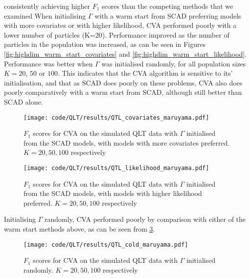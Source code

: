 \documentclass{amsart}[12pt]
\begin{document}
consistently achieving higher $F_1$ scores than the competing methods that we examined
When initialising $\Gamma$ with a warm start from SCAD preferring models with more covariates or with higher
likelihood, CVA performed poorly with a lower number of particles (K=$20$). Performance improved as the number
of particles in the population was increased, as can be seen in Figures
\ref{fig:highdim_warm_start_covariates} and \ref{fig:highdim_warm_start_likelihood}. Performance was better
when $\Gamma$ was initialised randomly, for all population sizes $K=20$, $50$ or $100$. This indicates that
the CVA algorithm is sensitive to its' initialisation, and that as SCAD does poorly on these problems, CVA
also does poorly comparatively with a warm start from SCAD, although still better than SCAD alone.

\begin{figure}\label{fig:QLT_warm_start_covariates}
\caption{$F_1$ scores for CVA on the simulated QLT data with $\Gamma$ initialised from the SCAD models, with
models with more covariates preferred. $K=20, 50, 100$ respectively}
\texttt{[image: code/QLT/results/QTL\_covariates\_maruyama.pdf]}

\end{figure}

\begin{figure}\label{fig:QLT_warm_start_covariates}
\caption{$F_1$ scores for CVA on the simulated QLT data with $\Gamma$ initialised from the SCAD models, with
models with higher likelihood preferred. $K=20, 50, 100$ respectively}
\texttt{[image: code/QLT/results/QTL\_likelihood\_maruyama.pdf]}
\end{figure}


Initialising $\Gamma$ randomly, CVA performed poorly by comparison with either of the warm start methods
above, as can be seen from \ref{fig:QLT_cold_start}.
\begin{figure}\label{fig:QLT_cold_start}
\caption{$F_1$ scores for CVA on the simulated QLT data with $\Gamma$ initialised randomly. $K=20, 50, 100$ respectively}
\texttt{[image: code/QLT/results/QTL\_cold\_maruyama.pdf]}

\end{figure}
\end{document}
